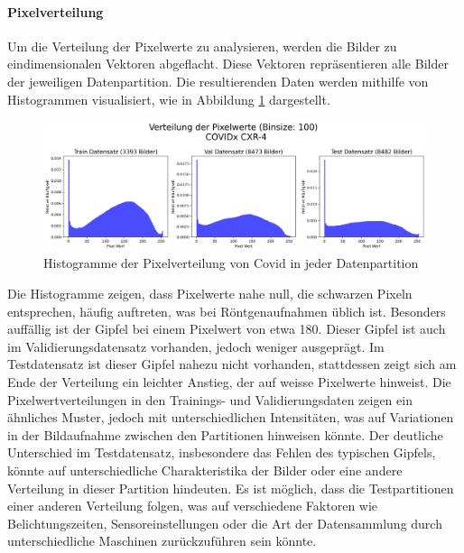 \paragraph{Pixelverteilung} \label{chap:COVID19-pixelverteilung}
Um die Verteilung der Pixelwerte zu analysieren, werden die Bilder zu eindimensionalen Vektoren abgeflacht. Diese Vektoren repräsentieren alle Bilder der jeweiligen Datenpartition. Die resultierenden Daten werden mithilfe von Histogrammen visualisiert, wie in Abbildung \ref{fig:covid-datapartition-pixelverteilung-histo} dargestellt.

\begin{figure}[H]
    \centering
    \includegraphics[width=\linewidth]{01-images/03-data/covid-Pixelverteilung-Partitionen.png}
    \caption{Histogramme der Pixelverteilung von Covid in jeder Datenpartition}
    \label{fig:covid-datapartition-pixelverteilung-histo}
\end{figure}

Die Histogramme zeigen, dass Pixelwerte nahe null, die schwarzen Pixeln entsprechen, häufig auftreten, was bei Röntgenaufnahmen üblich ist. Besonders auffällig ist der Gipfel bei einem Pixelwert von etwa 180. Dieser Gipfel ist auch im Validierungsdatensatz vorhanden, jedoch weniger ausgeprägt. Im Testdatensatz ist dieser Gipfel nahezu nicht vorhanden, stattdessen zeigt sich am Ende der Verteilung ein leichter Anstieg, der auf weisse Pixelwerte hinweist. Die Pixelwertverteilungen in den Trainings- und Validierungsdaten zeigen ein ähnliches Muster, jedoch mit unterschiedlichen Intensitäten, was auf Variationen in der Bildaufnahme zwischen den Partitionen hinweisen könnte. Der deutliche Unterschied im Testdatensatz, insbesondere das Fehlen des typischen Gipfels, könnte auf unterschiedliche Charakteristika der Bilder oder eine andere Verteilung in dieser Partition hindeuten. Es ist möglich, dass die Testpartitionen einer anderen Verteilung folgen, was auf verschiedene Faktoren wie Belichtungszeiten, Sensoreinstellungen oder die Art der Datensammlung durch unterschiedliche Maschinen zurückzuführen sein könnte.

